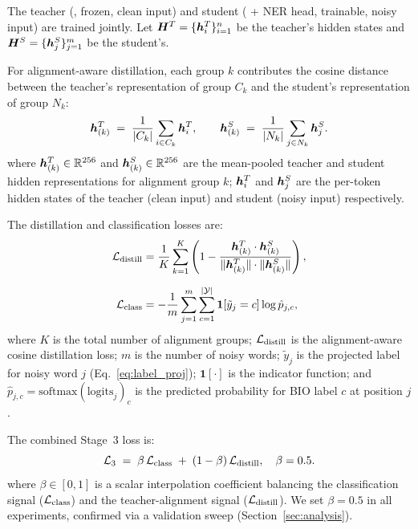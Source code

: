 The teacher (\LightRet{}, frozen, clean input) and student (\LightRet{}
+ NER head, trainable, noisy input) are trained jointly.
Let $\bm{H}^{T} = \{\bm{h}^{T}_{i}\}_{i=1}^{n}$ be the teacher's hidden states
and $\bm{H}^{S} = \{\bm{h}^{S}_{j}\}_{j=1}^{m}$ be the student's.

For alignment-aware distillation, each group $k$ contributes the
cosine distance between the teacher's representation of group $C_k$ and
the student's representation of group $N_k$:
\begin{equation}
  \bm{h}^{T}_{(k)} \;=\; \frac{1}{|C_k|}\sum_{i \in C_k} \bm{h}^{T}_{i},
  \qquad
  \bm{h}^{S}_{(k)} \;=\; \frac{1}{|N_k|}\sum_{j \in N_k} \bm{h}^{S}_{j}.
  \label{eq:align_pool}
\end{equation}
\noindent where $\bm{h}^{T}_{(k)} \in \mathbb{R}^{256}$ and $\bm{h}^{S}_{(k)} \in \mathbb{R}^{256}$ are the mean-pooled teacher and student hidden representations for alignment group $k$; $\bm{h}^{T}_{i}$ and $\bm{h}^{S}_{j}$ are the per-token hidden states of the teacher (clean input) and student (noisy input) respectively.

The distillation and classification losses are:
\begin{align}
  \mathcal{L}_{\text{distill}}
  &= \frac{1}{K} \sum_{k=1}^{K}
     \left(1 - \frac{\bm{h}^{T}_{(k)} \cdot \bm{h}^{S}_{(k)}}
                    {\|\bm{h}^{T}_{(k)}\| \cdot \|\bm{h}^{S}_{(k)}\|}\right),
  \label{eq:loss_distill}\\[6pt]
  \mathcal{L}_{\text{class}}
  &= -\frac{1}{m} \sum_{j=1}^{m}
     \sum_{c=1}^{|\mathcal{Y}|} \mathbf{1}[\tilde{y}_j = c]
     \log \hat{p}_{j,c},
  \label{eq:loss_class}
\end{align}
\noindent where $K$ is the total number of alignment groups; $\mathcal{L}_{\text{distill}}$ is the alignment-aware cosine distillation loss; $m$ is the number of noisy words; $\tilde{y}_j$ is the projected label for noisy word $j$ (Eq.~\ref{eq:label_proj}); $\mathbf{1}[\cdot]$ is the indicator function; and $\hat{p}_{j,c} = \text{softmax}(\text{logits}_j)_c$ is the predicted probability for BIO label $c$ at position $j$.

The combined Stage~3 loss is:
\begin{equation}
  \mathcal{L}_{3} \;=\; \beta\,\mathcal{L}_{\text{class}}
               \;+\; (1-\beta)\,\mathcal{L}_{\text{distill}},
  \quad \beta = 0.5.
  \label{eq:loss3}
\end{equation}
\noindent where $\beta \in [0,1]$ is a scalar interpolation coefficient balancing the classification signal ($\mathcal{L}_{\text{class}}$) and the teacher-alignment signal ($\mathcal{L}_{\text{distill}}$). We set $\beta{=}0.5$ in all experiments, confirmed via a validation sweep (Section~\ref{sec:analysis}).
